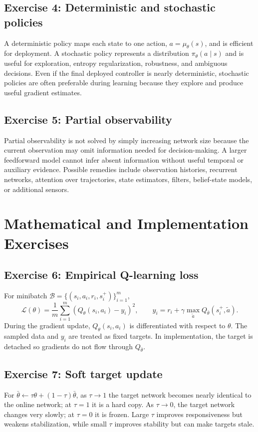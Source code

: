 \subsection*{Exercise 4: Deterministic and stochastic policies}
A deterministic policy maps each state to one action, $a=\mu_\theta(s)$, and is efficient for deployment. A stochastic policy represents a distribution $\pi_\theta(a\mid s)$ and is useful for exploration, entropy regularization, robustness, and ambiguous decisions. Even if the final deployed controller is nearly deterministic, stochastic policies are often preferable during learning because they explore and produce useful gradient estimates.

\subsection*{Exercise 5: Partial observability}
Partial observability is not solved by simply increasing network size because the current observation may omit information needed for decision-making. A larger feedforward model cannot infer absent information without useful temporal or auxiliary evidence. Possible remedies include observation histories, recurrent networks, attention over trajectories, state estimators, filters, belief-state models, or additional sensors.

\section*{Mathematical and Implementation Exercises}

\subsection*{Exercise 6: Empirical Q-learning loss}
For minibatch $\mathcal{B}=\{(s_i,a_i,r_i,s_i^+)\}_{i=1}^m$,
\[
\mathcal{L}(\theta)=\frac{1}{m}\sum_{i=1}^{m}\left(Q_\theta(s_i,a_i)-y_i\right)^2,
\qquad
 y_i=r_i+\gamma\max_{\tilde{a}}Q_{\bar{\theta}}(s_i^+,\tilde{a}).
\]
During the gradient update, $Q_\theta(s_i,a_i)$ is differentiated with respect to $\theta$. The sampled data and $y_i$ are treated as fixed targets. In implementation, the target is detached so gradients do not flow through $Q_{\bar\theta}$.

\subsection*{Exercise 7: Soft target update}
For $\bar{\theta}\leftarrow\tau\theta+(1-\tau)\bar{\theta}$, as $\tau\to 1$ the target network becomes nearly identical to the online network; at $\tau=1$ it is a hard copy. As $\tau\to 0$, the target network changes very slowly; at $\tau=0$ it is frozen. Large $\tau$ improves responsiveness but weakens stabilization, while small $\tau$ improves stability but can make targets stale.

